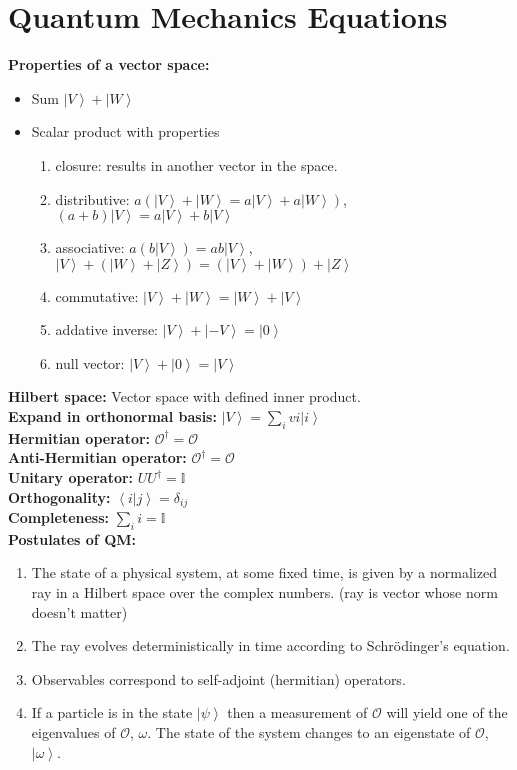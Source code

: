 \documentclass[12pt]{extarticle}
\newcommand{\ket}[1]{\left| #1 \right>}
\newcommand{\braket}[2]{\left< #1 | #2 \right>}
\begin{document}
\section{Quantum Mechanics Equations}
\textbf{Properties of a vector space:}
\begin{itemize}
  \item Sum $\ket{V} + \ket{W}$
  \item Scalar product with properties
  \begin{enumerate}
    \item closure: results in another vector in the space.
    \item distributive: $a(\ket{V}+\ket{W} = a\ket{V}+a\ket{W})$, $(a+b)\ket{V}=a\ket{V}+b\ket{V}$
    \item associative: $a(b\ket{V}) = ab\ket{V}$, $\ket{V}+(\ket{W}+\ket{Z})=(\ket{V}+\ket{W})+\ket{Z}$
    \item commutative: $\ket{V} + \ket{W} = \ket{W} + \ket{V}$
    \item addative inverse: $\ket{V} + \ket{-V} = \ket{0}$
    \item null vector: $\ket{V} + \ket{0} = \ket{V}$
  \end{enumerate}
\end{itemize}
\textbf{Hilbert space:} Vector space with defined inner product. \\
\textbf{Expand in orthonormal basis:}  $\ket{V} = \sum\limits_i vi \ket{i}$ \\
\textbf{Hermitian operator:} $\mathcal{O}^\dagger = \mathcal{O}$ \\
\textbf{Anti-Hermitian operator:} $\mathcal{O}^\dagger = \mathcal{O}$ \\
\textbf{Unitary operator:} $UU^\dagger = \mathbb{I}$ \\
\textbf{Orthogonality:} $\braket{i}{j} = \delta_{ij}$ \\
\textbf{Completeness:} $\sum\limits_ii = \mathbb{I}$ \\
\textbf{Postulates of QM: }
\begin{enumerate}
  \item  The state of a physical system, at some fixed time, is given by a normalized ray in a Hilbert space over the complex numbers. (ray is vector whose norm doesn't matter)
  \item The ray evolves deterministically in time according to Schr\"odinger’s equation.
  \item Observables correspond to self-adjoint (hermitian) operators.
  \item If a particle is in the state $\ket{\psi}$ then a measurement of $\mathcal{O}$ will yield one of the eigenvalues of $\mathcal{O}$, $\omega$. The state of the system changes to an eigenstate of $\mathcal{O}$, $\ket{\omega}$.
\end{enumerate}
\end{document}
